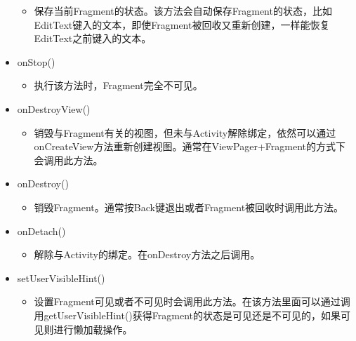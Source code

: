 \documentclass[9pt, b5paaper]{book}
\begin{document}
\begin{itemize}
\begin{itemize}
\item 保存当前Fragment的状态。该方法会自动保存Fragment的状态，比如EditText键入的文本，即使Fragment被回收又重新创建，一样能恢复EditText之前键入的文本。
\end{itemize}
\item onStop()
\begin{itemize}
\item 执行该方法时，Fragment完全不可见。
\end{itemize}
\item onDestroyView()
\begin{itemize}
\item 销毁与Fragment有关的视图，但未与Activity解除绑定，依然可以通过onCreateView方法重新创建视图。通常在ViewPager+Fragment的方式下会调用此方法。
\end{itemize}
\item onDestroy()
\begin{itemize}
\item 销毁Fragment。通常按Back键退出或者Fragment被回收时调用此方法。
\end{itemize}
\item onDetach()
\begin{itemize}
\item 解除与Activity的绑定。在onDestroy方法之后调用。
\end{itemize}
\item setUserVisibleHint()
\begin{itemize}
\item 设置Fragment可见或者不可见时会调用此方法。在该方法里面可以通过调用getUserVisibleHint()获得Fragment的状态是可见还是不可见的，如果可见则进行懒加载操作。
\end{itemize}
\end{itemize}
\end{document}
